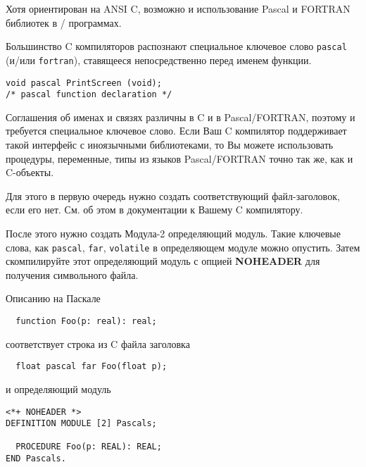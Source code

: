 Хотя \xds{} ориентирован на ANSI C, возможно и использование
{Pascal} и {FORTRAN} библиотек в 
\mt{}/\ot{} программах.

Большинство C компиляторов распознают специальное ключевое слово
{\tt pascal} (и/или {\tt fortran}), ставящееся непосредственно перед
именем функции.

\begin{verbatim}
void pascal PrintScreen (void);
/* pascal function declaration */
\end{verbatim}

Соглашения об именах и связях различны в 
C и в {Pascal}/{FORTRAN}, поэтому и требуется специальное ключевое слово.
Если Ваш C компилятор поддерживает такой интерфейс с иноязычными
библиотеками, то Вы можете использовать процедуры, переменные, типы
из языков {Pascal}/{FORTRAN} точно так же, как и C-объекты.

Для этого в первую очередь нужно создать соответствующий 
файл-заголовок, если его нет. См. об этом в документации к
Вашему C компилятору.

После этого нужно создать Модула-2 определяющий модуль.
Такие ключевые слова, как {\tt pascal}, {\tt far}, {\tt volatile} 
в определяющем модуле можно опустить.
Затем скомпилируйте этот определяющий модуль с опцией {\bf NOHEADER}
для получения символьного файла.

Описанию на Паскале
\begin{verbatim}
  function Foo(p: real): real;
\end{verbatim}
соответствует строка из C файла заголовка
\begin{verbatim}
  float pascal far Foo(float p);
\end{verbatim}

и определяющий модуль
\begin{verbatim}
<*+ NOHEADER *>
DEFINITION MODULE [2] Pascals;

  PROCEDURE Foo(p: REAL): REAL;
END Pascals.
\end{verbatim}

\fi %

